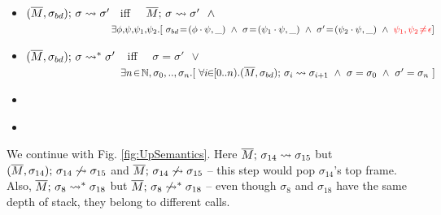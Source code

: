 {\begin{definition}
\begin{itemize}
\item
 $(\overline{M}, \sigma_{bd});\, {\sigma} \rightsquigarrow \sigma'$ \    iff \ \   $\leadstoOrig {\Mtwo} {\sigma} {\sigma'} %
\ \  \wedge $\\
$\strut  \hspace{2.9cm}\ \      \exists \phi,\!\psi,\!\psi_1,\!\psi_2.[ \  \sigma\bd\! =\! (\phi\cdot\psi,\_) \ \wedge \ \sigma\! =\! (\psi_1\cdot \psi, \_)
\ \wedge\ \sigma'\! =\! (\psi_2\cdot \psi, \_)\ \wedge\ \red{\psi_1,\psi_2\!\neq\! \epsilon}] $ 
\item
 $(\overline{M}, \sigma_{bd});\, {\sigma} \rightsquigarrow^* \sigma'$\ \  iff \ \ $\sigma=\sigma'\ \ \vee$\\
$\strut  \hspace{3cm}\ \ \exists n\!\in\!\mathbb{N},\sigma_0,..,\sigma_n.[\ \forall i\!\! \in\!\! [0..n).\leadstoBoundedThree {\Mtwo}  {\sigma_i}  {\sigma\bd} {\sigma_{i+1}} \ \wedge\ \sigma=\sigma_0\ \wedge\ \sigma'=\sigma_n\ ]$
 \item
{}
  \item
{}\ \  
\end{itemize}
\end{definition}
 

We continue with  Fig. \ref{fig:UpSemantics}. Here $\overline{M};\, \sigma_{14} \leadsto {\sigma_{15}}$ 
 but    $(\overline{M}, \sigma_{14});\, {\sigma_{14}} \not\rightsquigarrow \sigma_{15}$
and  $\overline{M};\, {\sigma_{14}} \not\rightsquigarrow \sigma_{15}$
--  this step would pop  $\sigma_{14}$'s
 top frame. 
 Also, $\overline{M};\, \sigma_8 \leadsto^* {\sigma_{18}}$ 
 but  $\overline{M};\, {\sigma_8} \not\rightsquigarrow^* \sigma_{18}$  -- even though $\sigma_8$ and $\sigma_{18}$ have the same depth of stack, they belong to different calls.
  

}
